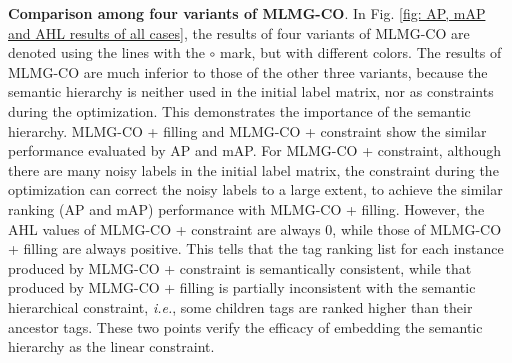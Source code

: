 \documentclass[twocolumn]{svjour3}          %
\begin{document}
\vspace{4pt}\noindent
\textbf{Comparison among four variants of MLMG-CO}. 
In Fig. \ref{fig: AP, mAP and AHL results of all cases}, the results of four variants of MLMG-CO are denoted using the lines with the $\circ$ mark, but with different colors. 
The results of MLMG-CO are much inferior to those of the other three variants, because the semantic hierarchy is neither used in the initial label matrix, nor as constraints during the optimization. This demonstrates the importance of the semantic hierarchy. 
MLMG-CO + filling and MLMG-CO + constraint show the similar performance evaluated by AP and mAP. For MLMG-CO + constraint, although there are many noisy labels in the initial label matrix, the constraint during the optimization can correct the noisy labels to a large extent, to achieve the similar ranking (AP and mAP) performance with MLMG-CO + filling. However, the AHL values of MLMG-CO + constraint are always 0, while those of MLMG-CO + filling are always positive. This tells that the tag ranking list for each instance produced by MLMG-CO + constraint is semantically consistent, while that produced by MLMG-CO + filling is partially inconsistent with the semantic hierarchical constraint, {\it i.e.}, some children tags are ranked higher than their ancestor tags. 
These two points verify the efficacy of embedding the semantic hierarchy as the linear constraint. 
\end{document}
